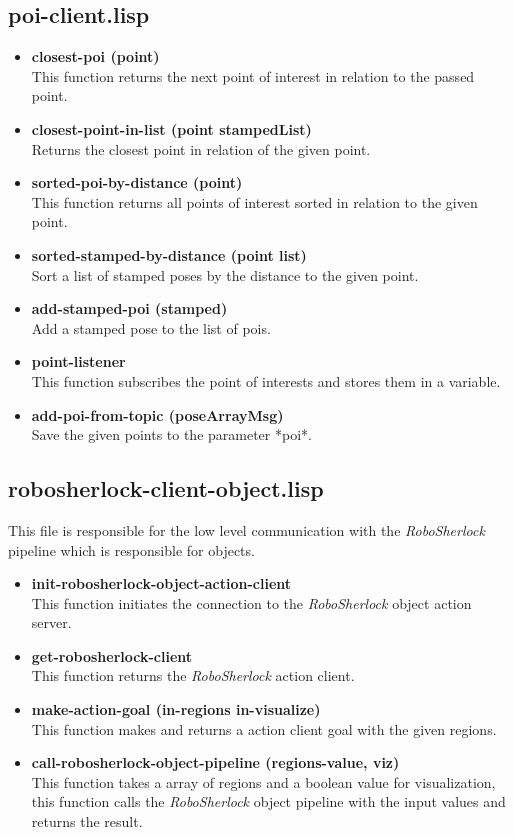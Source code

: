 \documentclass[main.tex]{subfiles}
\begin{document}
		\subsection{poi-client.lisp}
 		\begin{itemize}
	    	\item \textbf{closest-poi (point)} \\
	    	This function returns the next point of interest in relation to the passed point.
	    	\item \textbf{closest-point-in-list (point stampedList)} \\
	    	Returns the closest point in relation of the given point.
	    	\item \textbf{sorted-poi-by-distance (point)} \\
	    	This function returns all points of interest sorted in relation to the given point.
	    	\item \textbf{sorted-stamped-by-distance (point list)} \\
	    	Sort a list of stamped poses by the distance to the given point.
	    	\item \textbf{add-stamped-poi (stamped)} \\
	    	Add a stamped pose to the list of pois.
	    	\item \textbf{point-listener} \\
	    	This function subscribes the point of interests and stores them in a variable.
	    	\item \textbf{add-poi-from-topic (poseArrayMsg)} \\
	    	Save the given points to the parameter *poi*.
	    \end{itemize}
		\subsection{robosherlock-client-object.lisp}
		\label{object-perceive}
		This file is responsible for the low level communication with the \textit{RoboSherlock} pipeline which is responsible for objects.
		\begin{itemize}
			\item \textbf{init-robosherlock-object-action-client} \\
			This function initiates the connection to the \textit{RoboSherlock} object action server.
			\item \textbf{get-robosherlock-client} \\
			This function returns the \textit{RoboSherlock} action client.
			\item \textbf{make-action-goal (in-regions in-visualize)} \\
			This function makes and returns a action client goal with the given regions.
			\item \textbf{call-robosherlock-object-pipeline (regions-value, viz)} \\
			This function takes a array of regions and a boolean value for visualization, this function calls the \textit{RoboSherlock} object pipeline with the input values and returns the result.
		\end{itemize}
\end{document}
